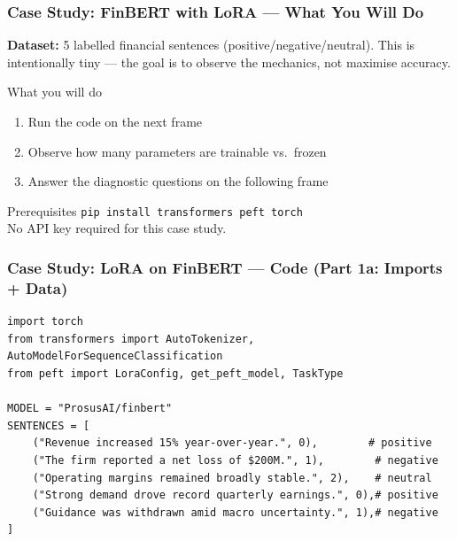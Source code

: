 \documentclass[9pt,t]{beamer}
\begin{document}
\begin{frame}
\frametitle{Case Study: FinBERT with LoRA --- What You Will Do}

\textbf{Dataset:} 5 labelled financial sentences (positive/negative/neutral).
This is intentionally tiny --- the goal is to observe the mechanics, not maximise accuracy.

\medskip
\begin{block}{What you will do}
  \begin{enumerate}
    \item Run the code on the next frame
    \item Observe how many parameters are trainable vs.\ frozen
    \item Answer the diagnostic questions on the following frame
  \end{enumerate}
\end{block}

\medskip
\begin{alertblock}{Prerequisites}
  \texttt{pip install transformers peft torch}\\
  No API key required for this case study.
\end{alertblock}
\end{frame}

\begin{frame}[fragile]
\frametitle{Case Study: LoRA on FinBERT --- Code (Part 1a: Imports + Data)}

{\footnotesize
\begin{lstlisting}
import torch
from transformers import AutoTokenizer, AutoModelForSequenceClassification
from peft import LoraConfig, get_peft_model, TaskType

MODEL = "ProsusAI/finbert"
SENTENCES = [
    ("Revenue increased 15% year-over-year.", 0),        # positive
    ("The firm reported a net loss of $200M.", 1),        # negative
    ("Operating margins remained broadly stable.", 2),    # neutral
    ("Strong demand drove record quarterly earnings.", 0),# positive
    ("Guidance was withdrawn amid macro uncertainty.", 1),# negative
]
\end{lstlisting}
}
\end{frame}
\end{document}
